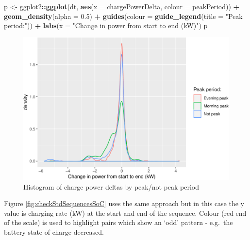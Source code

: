 \documentclass[]{article}
\newenvironment{Shaded}{\begin{snugshade}}{\end{snugshade}}
\newcommand{\DataTypeTok}[1]{\textcolor[rgb]{0.13,0.29,0.53}{#1}}
\newcommand{\FloatTok}[1]{\textcolor[rgb]{0.00,0.00,0.81}{#1}}
\newcommand{\KeywordTok}[1]{\textcolor[rgb]{0.13,0.29,0.53}{\textbf{#1}}}
\newcommand{\NormalTok}[1]{#1}
\newcommand{\OperatorTok}[1]{\textcolor[rgb]{0.81,0.36,0.00}{\textbf{#1}}}
\newcommand{\StringTok}[1]{\textcolor[rgb]{0.31,0.60,0.02}{#1}}
\begin{document}
\begin{Shaded}
\begin{Highlighting}[]
\NormalTok{p <-}\StringTok{ }\NormalTok{ggplot2}\OperatorTok{::}\KeywordTok{ggplot}\NormalTok{(dt, }\KeywordTok{aes}\NormalTok{(}\DataTypeTok{x =}\NormalTok{ chargePowerDelta, }\DataTypeTok{colour =}\NormalTok{ peakPeriod)) }\OperatorTok{+}
\StringTok{  }\KeywordTok{geom_density}\NormalTok{(}\DataTypeTok{alpha =} \FloatTok{0.5}\NormalTok{) }\OperatorTok{+}
\StringTok{  }\KeywordTok{guides}\NormalTok{(}\DataTypeTok{colour =} \KeywordTok{guide_legend}\NormalTok{(}\DataTypeTok{title =} \StringTok{"Peak period:"}\NormalTok{)) }\OperatorTok{+}
\StringTok{  }\KeywordTok{labs}\NormalTok{(}\DataTypeTok{x =} \StringTok{"Change in power from start to end (kW)"}\NormalTok{)}
\NormalTok{p}
\end{Highlighting}
\end{Shaded}

\begin{figure}
\centering
\includegraphics{EVBB_report_v1_files/figure-latex/stdPowerDeltaDensity-1.pdf}
\caption{\label{fig:stdPowerDeltaDensity}Histogram of charge power deltas by peak/not peak period}
\end{figure}

Figure \ref{fig:checkStdSequencesSoC} uses the same approach but in this case the y value is charging rate (kW) at the start and end of the sequence. Colour (red end of the scale) is used to highlight pairs which show an `odd' pattern - e.g.~the battery state of charge decreased.
\end{document}
